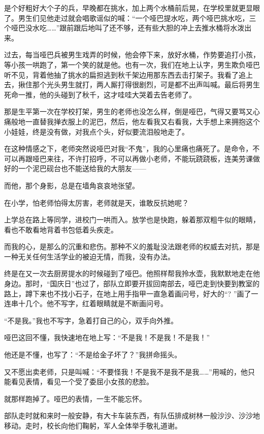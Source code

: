 \par 是个好粗好大个子的兵，早晚都在挑水，加上两个水桶前后晃，在学校里就更显眼了。男生们见他走过就会唱歌谣似的喊：“一个哑巴提水吃，两个哑巴挑水吃，三个哑巴没水吃……”跟前跟后地叫了还不够，还有些大胆的冲上去推水桶将水泼出来。
\par 过去，每当哑巴兵被男生戏弄的时候，他会停下来，放好水桶，作势要追打小孩，等小孩一哄跑了，第一个笑的就是他。也有一次，我们在地上认字，男生欺负哑巴听不见，背着他抽了挑水的扁担逃到秋千架边用那东西去击打架子。我看了追上去，揪住那个光头男生就打，两人厮打得很剧烈，可是都不出声叫喊。最后将男生死命一推，他的头碰到了秋千，这才哇哇大哭着去告老师了。
\par 那是生平第一次在学校打架，男生的老师也没怎么样，倒是哑巴，气得又要骂又心痛般地一直替我掸衣服上的泥巴，然后，他左看我又右看我，大手想上来拥抱这个小娃娃，终是没有做，对我点个头，好似要流泪般地走了。
\par 在这种情感之下，老师突然说哑巴对我“不鬼”，我的心里痛也痛死了。是命令，不可以再跟哑巴来往，不许打招呼，不可以再做小老师，不能玩跷跷板，连美劳课做好的一个泥巴砚台也不能送给我的大朋友——
\par 而他，那个身影，总是在墙角哀哀地张望。
\par 在小学，怕老师怕得太厉害，老师就是天，谁敢反抗她呢？
\par 上学总在路上等同学，进校门一哄而入。放学也是快跑，躲着那双粗牛似的眼睛，看也不敢看地背着书包低着头疾走。
\par 而我的心，是那么的沉重和悲伤。那种不义的羞耻没法跟老师的权威去对抗，那是一种无关任何生活学业的被迫无情，而我，没有办法。
\par 终是在又一次去厨房提水的时候碰到了哑巴。他照样帮我拎水壶，我默默地走在他身边。那时，“国庆日”也过了，部队立即要开拔回南部去，哑巴走到快要到教室的路上，蹲下来也不找小石子，在地上用手指甲一直急着画问号，好大的“? ”画了一连串十几个。他不写字，红着眼睛就是不断画问号。
\par “不是我。”我也不写字，急着打自己的心，双手向外推。
\par 哑巴这回不懂，我快速地在地上写：“不是我！不是我！不是我！”
\par 他还是不懂，也写了：“不是给金子坏了？”我拼命摇头。
\par 又不愿出卖老师，只是叫喊：“不要怪我！不是我不是我不是我……”用喊的，他只能看见表情，看见一个受了委屈小女孩的悲脸。
\par 就那样跑掉了。哑巴的表情，一生不能忘怀。
\par 部队走时就和来时一般安静，有大卡车装东西，有队伍排成树林一般沙沙、沙沙地移动。走时，校长向他们鞠躬，军人全体举手敬礼道谢。
